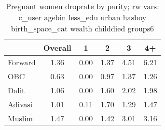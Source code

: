 \begin{table}[htbp]\centering
\caption{Pregnant women droprate by parity; rw vars: c\_user agebin less\_edu urban hasboy birth\_space\_cat wealth childdied groups6}
\begin{tabular}{l*{5}{c}}
\toprule
            &\multicolumn{1}{c}{Overall}&\multicolumn{1}{c}{1}&\multicolumn{1}{c}{2}&\multicolumn{1}{c}{3}&\multicolumn{1}{c}{4+}\\
\midrule
\midrule
Forward     &        1.36&        0.00&        1.37&        4.51&        6.21\\
OBC         &        0.63&        0.00&        0.97&        1.37&        1.26\\
Dalit       &        1.06&        0.00&        1.60&        2.02&        1.98\\
Adivasi     &        1.01&        0.11&        1.70&        1.29&        1.47\\
Muslim      &        1.47&        0.00&        1.42&        3.01&        3.16\\
\bottomrule
\end{tabular}
\end{table}
